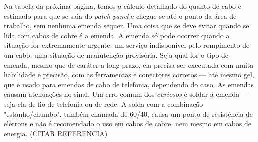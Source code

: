 \documentclass[	DIV=calc,%
							paper=a4,%
							fontsize=12pt,%
							onecolumn]{scrartcl}	 					%
\begin{document}
Na tabela da próxima página, temos o cálculo detalhado do quanto de cabo é estimado para que se saia do \textit{patch panel} e chegue-se até o ponto da área de trabalho, sem nenhuma emenda sequer. Uma coisa que se deve evitar quando se lida com cabos de cobre é a emenda. A emenda só pode ocorrer quando a situação for extremamente urgente: um serviço indisponível pelo rompimento de um cabo; uma situação de manutenção provisória. Seja qual for o tipo de emenda, mesmo que de caráter a long prazo, ela precisa ser executada com muita habilidade e precisão, com as ferramentas e conectores corretos --- até mesmo gel, que é usado para emendas de cabo de telefonia, dependendo do caso. As emendas causam atenuações no sinal. Um erro comum dos \textit{curiosos} é soldar a emenda --- seja ela de fio de telefonia ou de rede. A solda com a combinação "estanho/chumbo", também chamada de 60/40, causa um ponto de resistência de elétrons e não é recomendado o uso em cabos de cobre, nem mesmo em cabos de energia. (CITAR REFERENCIA) 




\clearpage

\recalctypearea
\end{document}
